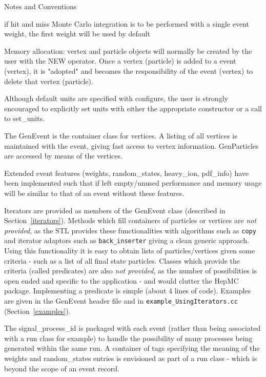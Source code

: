 \documentclass[11pt,letterpaper]{article}
\begin{document}
\begin{myitemize}{Notes and Conventions}
  \item if hit and miss Monte Carlo integration is to be performed
    with a single event weight, the first weight will be used by default
  \item Memory allocation: vertex and particle objects will normally
    be created by the user with the NEW operator. Once a vertex
    (particle) is added to a event (vertex), it is "adopted" and
    becomes the responsibility of the event (vertex) to delete that
    vertex (particle).
  \item Although default units are specified with configure, the user
    is strongly encouraged to explicitly set units with either the
    appropriate constructor or a call to set\_units.
\end{myitemize}

The GenEvent is the container class for vertices. 
A listing of all vertices is maintained with the event, giving fast
access to vertex information. GenParticles are accessed by means of the
vertices.

Extended event features (weights, random\_states, heavy\_ion, pdf\_info) 
have been implemented such that if left empty/unused performance and memory
usage will be similar to that of an event without these features.

Iterators are provided as members of the GenEvent class
(described in Section~\ref{iterators}). Methods which fill containers of
particles or vertices are {\it not provided}, as the STL provides these
functionalities with algorithms such as \verb!copy! and iterator adaptors
such as \verb!back_inserter! giving a clean generic approach.
Using this functionality it is easy to obtain lists of
particles/vertices given some criteria - such as a list of all final
state particles. Classes which provide the criteria (called
predicates) are also {\it not provided}, as the number of
possibilities is open ended and specific to the application -
and would clutter the HepMC package. Implementing a predicate is
simple (about 4 lines of code).
Examples are given in the GenEvent header file and in
\verb!example_UsingIterators.cc! (Section~\ref{examples}).

The signal\_process\_id is packaged with each event (rather than being
associated with a run class for example) to handle the possibility of
many processes being generated within the same run. A container of
tags specifying the meaning of the weights and random\_states entries
is envisioned as part of a run class - which is beyond the scope of an
event record.
\end{document}
